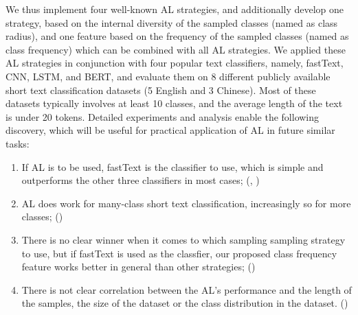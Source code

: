 We thus implement four well-known AL strategies, and additionally develop one strategy, based on the internal diversity of the sampled classes
(named as class radius), and one feature based on the frequency of
the sampled classes (named as class frequency) which can be combined with all AL strategies. 
We applied these AL strategies in conjunction with
four popular text classifiers, namely, fastText, CNN, 
LSTM, and BERT, and evaluate them on 8 different publicly
available short text classification datasets (5 English and 3 Chinese). 
Most of these datasets typically involves at least 10 classes, 
and the average length of the text is under 20 tokens. Detailed experiments
and analysis enable the following discovery, which will be useful for
practical application of AL in future similar tasks:

\begin{enumerate}
\item If AL is to be used, fastText is the classifier to use, which is simple
and outperforms the other three classifiers in most cases; (, )
\item AL does work for many-class short text classification, increasingly so
for more classes; ()
\item There is no clear winner when it comes to which sampling sampling
strategy to use, but if fastText is used as the classfier, our proposed
class frequency feature works better in general than other strategies; ()
\item There is not clear correlation between the AL's performance and the
length of the samples, the size of the dataset or the class distribution
in the dataset. ()
\end{enumerate}

